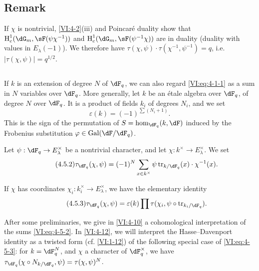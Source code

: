 \subsection{Remark}\label{VI:4-4}

If $\chi$ is nontrivial, \ref{VI:4-2}(iii) and Poincaré duality 
show that $\h_c^1(\dG_m,\sF(\psi\chi^{-1}))$ and 
$\h_c^1(\dG_m,\sF(\psi^{-1}\chi))$ are in duality (duality with values 
in $E_\lambda(-1)$). We therefore have 
$\tau(\chi,\psi)\cdot \tau(\chi^{-1},\psi^{-1}) = q$, i.e. 
$|\tau(\chi,\psi)|=q^{1/2}$. 





\subsection{}\label{VI:4-5}

If $k$ is an extension of degree $N$ of $\dF_q$, we can also regard 
\eqref{VI:eq:4-1-1} as a sum in $N$ variables over $\dF_q$. More 
generally, let $k$ be an étale algebra over $\dF_q$, of degree $N$ over 
$\dF_q$. It is a product of fields $k_i$ of degrees $N_i$, and we set 
\begin{equation*}\tag{4.5.1}\label{VI:eq:4-5-1}
  \varepsilon(k) = (-1)^{\sum (N_i+1)} \text{.} 
\end{equation*}
This is the sign of the permutation of $S=\hom_{\dF_q}(k,\dF)$ induced by the 
Frobenius substitution $\varphi\in \gal(\dF/\dF_q)$. 

Let $\psi:\dF_q\to E_\lambda^\times$ be a nontrivial character, and let 
$\chi:k^\times \to E_\lambda^\times$. We set 
\begin{equation*}\tag{4.5.2}\label{VI:eq:4-5-2}
  \tau_{\dF_q}(\chi,\psi) = (-1)^N \sum_{x\in k^\times} \psi \tr_{k/\dF_q}(x) \cdot \chi^{-1}(x) \text{.} 
\end{equation*}

If $\chi$ has coordinates $\chi_i:k_i^\times \to E_\lambda^\times$, we 
have the elementary identity 
\begin{equation*}\tag{4.5.3}\label{VI:eq:4-5-3}
  \tau_{\dF_q}(\chi,\psi) = \varepsilon(k) \prod \tau(\chi_i,\psi\circ \tr_{k_i/\dF_q}) \text{.}
\end{equation*}

After some preliminaries, we give in \ref{VI:4-10} a 
cohomological interpretation of the sums \eqref{VI:eq:4-5-2}. In 
\ref{VI:4-12}, we will interpret the Hasse--Davenport identity as a 
twisted form (cf. \ref{VI:1-12}) of the following special case of 
\eqref{VI:eq:4-5-3}: for $k=\dF_q^N$, and $\chi$ a character of 
$\dF_q^\times$, we have 
$\tau_{\dF_q}(\chi\circ N_{k/\dF_q},\psi)=\tau(\chi,\psi)^N$. 





